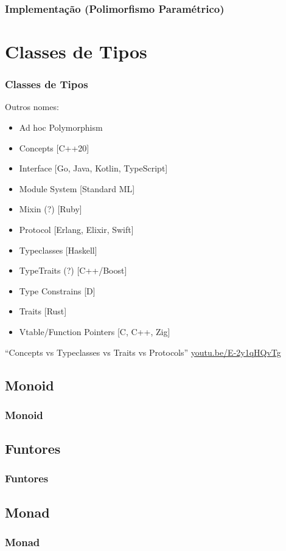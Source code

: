 \documentclass{beamer}
\begin{document}
\begin{frame}
    \frametitle{Implementação (Polimorfismo Paramétrico)}
\end{frame}

\section{Classes de Tipos}
\begin{frame}
    \frametitle{Classes de Tipos}
    Outros nomes:
    \begin{itemize}
        \item Ad hoc Polymorphism
        \item Concepts [C++20]
        \item Interface [Go, Java, Kotlin, TypeScript]
        \item Module System [Standard ML]
        \item Mixin (?) [Ruby]
        \item Protocol [Erlang, Elixir, Swift]
        \item Typeclasses [Haskell]
        \item TypeTraits (?) [C++/Boost]
        \item Type Constrains [D]
        \item Traits [Rust]
        \item Vtable/Function Pointers [C, C++, Zig]
    \end{itemize}
    \vfill
    ``Concepts vs Typeclasses vs Traits vs Protocols''
    \url{youtu.be/E-2y1qHQvTg}
\end{frame}

\subsection{Monoid}
\begin{frame}
    \frametitle{Monoid}
\end{frame}

\subsection{Funtores}
\begin{frame}
    \frametitle{Funtores}
\end{frame}

\subsection{Monad}
\begin{frame}
    \frametitle{Monad}
\end{frame}
\end{document}
